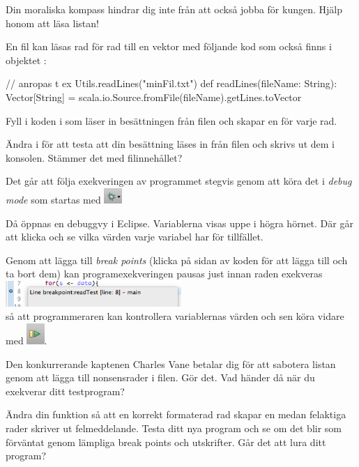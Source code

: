 
\Subtask Din moraliska kompass hindrar dig inte från att också jobba för kungen. Hjälp honom att läsa listan!

En fil  kan läsas rad för rad till en vektor med följande kod som också finns i objektet : 

\begin{Code}
// anropas t ex Utils.readLines("minFil.txt")
def readLines(fileName: String): Vector[String] = {
	   scala.io.Source.fromFile(fileName).getLines.toVector
	}
\end{Code}
Fyll i koden i  som läser in besättningen från filen och skapar en  för varje rad. 

\Subtask Ändra i  för att testa att din besättning läses in från filen och skrivs ut dem i konsolen. Stämmer det med filinnehållet?

\Subtask Det går att följa exekveringen av programmet stegvis genom att köra det i \emph{debug mode} som startas med 
\includegraphics[width=0.05\textwidth]{../img/pirates/bug.png}

Då öppnas en debuggvy i Eclipse. Variablerna visas uppe i högra hörnet. Där går att klicka och se vilka värden varje variabel har för tillfället. 

Genom att lägga till \emph{break points} (klicka på sidan av koden för att lägga till och ta bort dem) kan programexekveringen pausas just innan raden exekveras  \\
\includegraphics[width=0.5\textwidth]{../img/pirates/breakpoint.png} \\
så att programmeraren kan kontrollera variablernas värden och sen köra vidare med \includegraphics[width=0.05\textwidth]{../img/pirates/next.png}.

\Subtask Den konkurrerande kaptenen Charles Vane betalar dig för att sabotera listan genom att lägga till nonsensrader i filen. Gör det. Vad händer då när du exekverar ditt testprogram?

\Subtask Ändra din funktion  så att en korrekt formaterad rad skapar en  medan felaktiga rader skriver ut felmeddelande.
Testa ditt nya program och se om det blir som förväntat genom lämpliga break points och utskrifter. Går det att lura ditt program?

